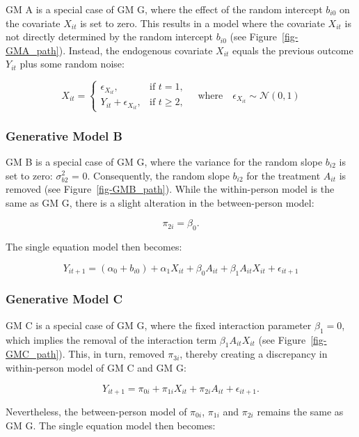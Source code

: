 \documentclass[
  11pt,
  a4paper,
]{article}
\begin{document}
GM A is a special case of GM G, where the effect of the random intercept
\(b_{i0}\) on the covariate \(X_{it}\) is set to zero. This results in a
model where the covariate \(X_{it}\) is not directly determined by the
random intercept \(b_{i0}\) (see Figure~\ref{fig-GMA_path}). Instead,
the endogenous covariate \(X_{it}\) equals the previous outcome
\(Y_{it}\) plus some random noise:

\[
X_{it} = 
\begin{cases} 
\epsilon_{X_{it}}, & \text{if } t = 1, \\
Y_{it} + \epsilon_{X_{it}}, & \text{if } t \geq 2,
\end{cases}
\quad \text{where} \quad \epsilon_{X_{it}} \sim \mathcal{N}(0, 1)
\]

\subsubsection{Generative Model B}\label{generative-model-b}

GM B is a special case of GM G, where the variance for the random slope
\(b_{i2}\) is set to zero: \(\sigma_{b2}^2\) = 0. Consequently, the
random slope \(b_{i2}\) for the treatment \(A_{it}\) is removed (see
Figure~\ref{fig-GMB_path}). While the within-person model is the same as
GM G, there is a slight alteration in the between-person model:

\[ \pi_{2i} = \beta_0. \]

The single equation model then becomes:

\[
Y_{it+1} = (\alpha_0 + b_{i0}) + \alpha_1 X_{it} + \beta_0 A_{it} + \beta_1 A_{it} X_{it} + \epsilon_{it+1}
\]

\subsubsection{Generative Model C}\label{generative-model-c}

GM C is a special case of GM G, where the fixed interaction parameter
\(\beta_1 = 0\), which implies the removal of the interaction term
\(\beta_1 A_{it} X_{it}\) (see Figure~\ref{fig-GMC_path}). This, in
turn, removed \(\pi_{3i}\), thereby creating a discrepancy in
within-person model of GM C and GM G:

\[Y_{it+1} = \pi_{0i} + \pi_{1i} X_{it} + \pi_{2i} A_{it} + \epsilon_{it+1}.\]

Nevertheless, the between-person model of \(\pi_{0i}\), \(\pi_{1i}\) and
\(\pi_{2i}\) remains the same as GM G. The single equation model then
becomes:
\end{document}
